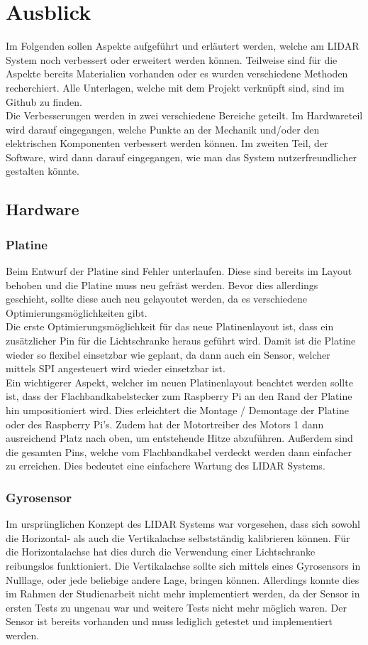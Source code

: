 \chapter{Ausblick}\label{chap:ausblick}
Im Folgenden sollen Aspekte aufgeführt und erläutert werden, welche am \ac{LIDAR} System noch verbessert oder erweitert werden können. Teilweise sind für die Aspekte bereits Materialien vorhanden oder es wurden verschiedene Methoden recherchiert. Alle Unterlagen, welche mit dem Projekt verknüpft sind, sind im Github zu finden.\\
Die Verbesserungen werden in zwei verschiedene Bereiche geteilt. Im Hardwareteil wird darauf eingegangen, welche Punkte an der Mechanik und/oder den elektrischen Komponenten verbessert werden können. Im zweiten Teil, der Software, wird dann darauf eingegangen, wie man das System nutzerfreundlicher gestalten könnte.  
\section{Hardware}
\subsection{Platine}
Beim Entwurf der Platine sind Fehler unterlaufen. Diese sind bereits im Layout behoben und die Platine muss neu gefräst werden. Bevor dies allerdings geschieht, sollte diese auch neu gelayoutet werden, da es verschiedene Optimierungsmöglichkeiten gibt. \\
Die erste Optimierungsmöglichkeit für das neue Platinenlayout ist, dass ein zusätzlicher Pin für die Lichtschranke heraus geführt wird. Damit ist die Platine wieder so flexibel einsetzbar wie geplant, da dann auch ein Sensor, welcher mittels \ac{SPI} angesteuert wird wieder einsetzbar ist.\\
Ein wichtigerer Aspekt, welcher im neuen Platinenlayout beachtet werden sollte ist, dass der Flachbandkabelstecker zum Raspberry Pi an den Rand der Platine hin umpositioniert wird. Dies erleichtert die Montage / Demontage der Platine oder des Raspberry Pi's. Zudem hat der Motortreiber des Motors 1 dann ausreichend Platz nach oben, um entstehende Hitze abzuführen. Außerdem sind die gesamten Pins, welche vom Flachbandkabel verdeckt werden dann einfacher zu erreichen. Dies bedeutet eine einfachere Wartung des \ac{LIDAR} Systems.
\subsection{Gyrosensor}
Im ursprünglichen Konzept des \ac{LIDAR} Systems war vorgesehen, dass sich sowohl die Horizontal- als auch die Vertikalachse selbstständig kalibrieren können. Für die Horizontalachse hat dies durch die Verwendung einer Lichtschranke reibungslos funktioniert. Die Vertikalachse sollte sich mittels eines Gyrosensors in Nulllage, oder jede beliebige andere Lage, bringen können. Allerdings konnte dies im Rahmen der Studienarbeit nicht mehr implementiert werden, da der Sensor in ersten Tests zu ungenau war und weitere Tests nicht mehr möglich waren. Der Sensor  ist bereits vorhanden und muss lediglich getestet und implementiert werden.
